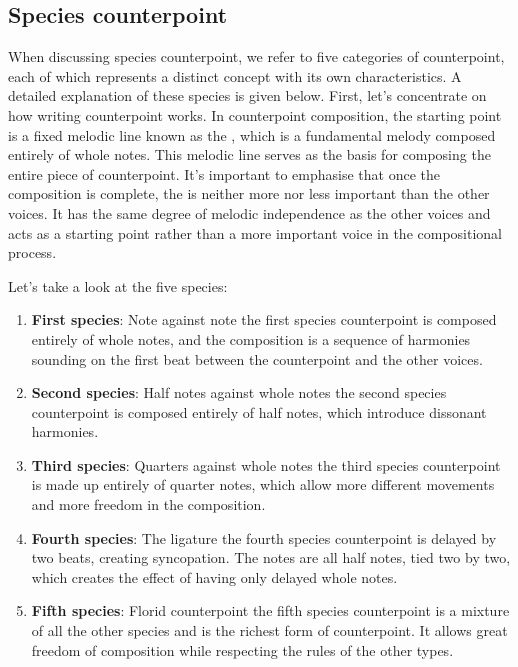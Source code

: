 \subsection{Species counterpoint}\label{section:species-counterpoint}
When discussing species counterpoint, we refer to five categories of counterpoint, each of which represents a distinct concept with its own characteristics. A detailed explanation of these species is given below. First, let's concentrate on how writing counterpoint works. In counterpoint composition, the starting point is a fixed melodic line known as the \cf, which is a fundamental melody composed entirely of whole notes. This melodic line serves as the basis for composing the entire piece of counterpoint. It's important to emphasise that once the composition is complete, the \cfs is neither more nor less important than the other voices. It has the same degree of melodic independence as the other voices and acts as a starting point rather than a more important voice in the compositional process.

Let's take a look at the five species:
\begin{enumerate}
    \item \textbf{First species}: Note against note \textendash{} the first species counterpoint is composed entirely of whole notes, and the composition is a sequence of harmonies sounding on the first beat between the counterpoint and the other voices.
    \item \textbf{Second species}: Half notes against whole notes \textendash{} the second species counterpoint is composed entirely of half notes, which introduce dissonant harmonies.
    \item \textbf{Third species}: Quarters against whole notes \textendash{} the third species counterpoint is made up entirely of quarter notes, which allow more different movements and more freedom in the composition.
    \item \textbf{Fourth species}: The ligature \textendash{} the fourth species counterpoint is delayed by two beats, creating syncopation. The notes are all half notes, tied two by two, which creates the effect of having only delayed whole notes.
    \item \textbf{Fifth species}: Florid counterpoint \textendash{} the fifth species counterpoint is a mixture of all the other species and is the richest form of counterpoint. It allows great freedom of composition while respecting the rules of the other types.
\end{enumerate}

